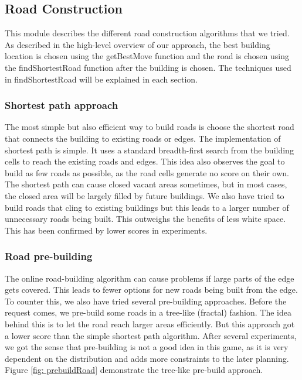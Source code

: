 \subsection{Road Construction}
This module describes the different road construction algorithms that we tried. As described in the high-level overview of our approach, the best building location is chosen using the getBestMove function and the road is chosen using the findShortestRoad function after the building is chosen. The techniques used in findShortestRoad will be explained in each section.

\subsubsection{Shortest path approach}
The most simple but also efficient way to build roads is choose the shortest road that connects the building to existing roads or edges. The implementation of shortest path is simple. It uses a standard breadth-first search from the building cells to reach the existing roads and edges. This idea also observes the goal to build as few roads as possible, as the road cells generate no score on their own. The shortest path can cause closed vacant areas sometimes, but in most cases, the closed area will be largely filled by future buildings. We also have tried to build roads that cling to existing buildings but this leads to a larger number of unnecessary roads being built. This outweighs the benefits of less white space. This has been confirmed by lower scores in experiments.

\subsubsection{Road pre-building}
The online road-building algorithm can cause problems if large parts of the edge gets covered. This leads to fewer options for new roads being built from the edge. To counter this, we also have tried several pre-building approaches. Before the request comes, we pre-build some roads in a tree-like (fractal) fashion. The idea behind this is to let the road reach larger areas efficiently. But this approach got a lower score than the simple shortest path algorithm. After several experiments, we got the sense that pre-building is not a good idea in this game, as it is very dependent on the distribution and adds more constraints to the later planning.
Figure \ref{fig: prebuildRoad} demonstrate the tree-like pre-build approach.

